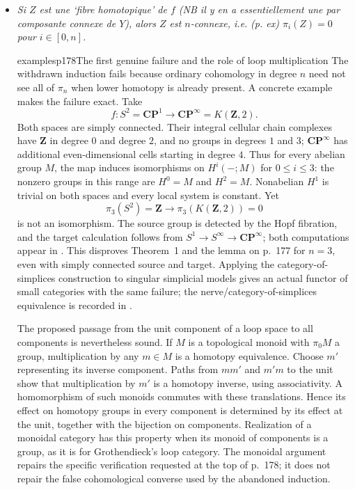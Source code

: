 \begin{itemize}
\item[$a_n$)] \textit{Si $Z$ est une `fibre homotopique' de $f$ (NB il y en a essentiellement une par composante connexe de $Y$), alors $Z$ est $n$-connexe, i.e.}
\textit{(p. ex) $\pi_i(Z) = 0$ pour $i \in [0,n]$.}

\begin{dcomment}{examples}{p178}{The first genuine failure and the role of loop multiplication}
The withdrawn induction fails because ordinary cohomology in degree $n$ need not see all of $\pi_n$ when lower homotopy is already present. A concrete example makes the failure exact. Take
\[
 f:S^2=\mathbf{CP}^{1}\longrightarrow\mathbf{CP}^{\infty}=K(\mathbf Z,2).
\]
Both spaces are simply connected. Their integral cellular chain complexes have $\mathbf Z$ in degree $0$ and degree $2$, and no groups in degrees $1$ and $3$; $\mathbf{CP}^{\infty}$ has additional even-dimensional cells starting in degree $4$. Thus for every abelian group $M$, the map induces isomorphisms on $H^i(-;M)$ for $0\leq i\leq3$: the nonzero groups in this range are $H^0=M$ and $H^2=M$. Nonabelian $H^1$ is trivial on both spaces and every local system is constant. Yet
\[
 \pi_3(S^2)=\mathbf Z\longrightarrow
 \pi_3(K(\mathbf Z,2))=0
\]
is not an isomorphism. The source group is detected by the Hopf fibration, and the target calculation follows from $S^1\to S^\infty\to\mathbf{CP}^{\infty}$; both computations appear in \citet[Examples~4.50--4.51]{Hatcher2002}. This disproves Theorem~1 and the lemma on p.~177 for $n=3$, even with simply connected source and target. Applying the category-of-simplices construction to singular simplicial models gives an actual functor of small categories with the same failure; the nerve/category-of-simplices equivalence is recorded in \citet[Lemma~2.1.15]{Cisinski2004Minimal}.

The proposed passage from the unit component of a loop space to all components is nevertheless sound. If $M$ is a topological monoid with $\pi_0M$ a group, multiplication by any $m\in M$ is a homotopy equivalence. Choose $m'$ representing its inverse component. Paths from $mm'$ and $m'm$ to the unit show that multiplication by $m'$ is a homotopy inverse, using associativity. A homomorphism of such monoids commutes with these translations. Hence its effect on homotopy groups in every component is determined by its effect at the unit, together with the bijection on components. Realization of a monoidal category has this property when its monoid of components is a group, as it is for Grothendieck's loop category. The monoidal argument repairs the specific verification requested at the top of p.~178; it does not repair the false cohomological converse used by the abandoned induction.
\end{dcomment}



\end{itemize}
